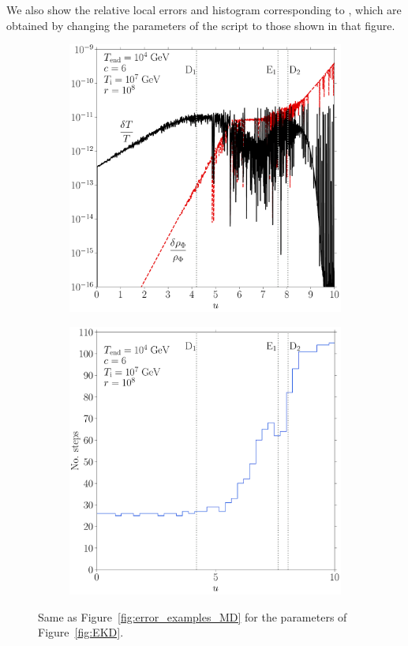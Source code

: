 \documentclass[11pt,a4paper]{article}
\begin{document}
We also show the relative local errors and histogram corresponding to , which are obtained by changing the parameters of the script to those shown in that figure.   
%
\begin{figure}[t]
	\begin{subfigure}{0.5\textwidth}
		\includegraphics[width=1\textwidth]{figs/EKD_err.pdf}
		\caption{}
		\label{fig:EKD_err}
	\end{subfigure}
	\begin{subfigure}{0.5\textwidth}
		\includegraphics[width=1\textwidth]{figs/EKD_hist.pdf}
		\caption{}
		\label{fig:EKD_hist}
	\end{subfigure}
	\caption{Same as  Figure~\ref{fig:error_examples_MD} for the parameters of Figure~\ref{fig:EKD}.}
	\label{fig:error_examples_KD}
\end{figure}
\end{document}
